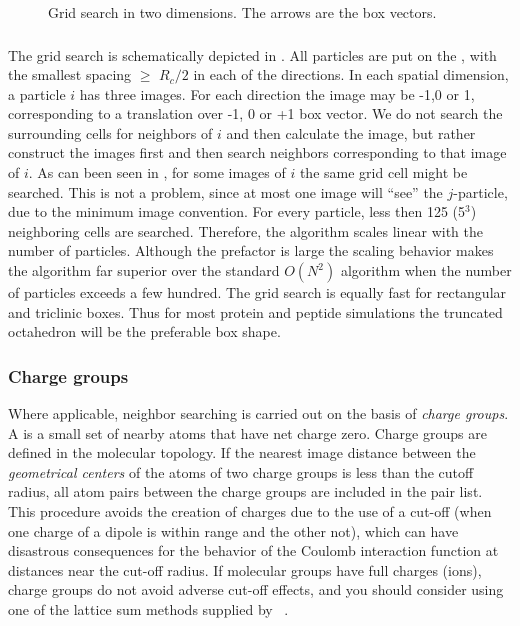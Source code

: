 \begin{figure}
\centerline{}
\caption {Grid search in two dimensions. The arrows are the box vectors.}
\label{fig:grid}
\end{figure}

\subsubsection{}
\label{sec:nsgrid}
The grid search is schematically depicted in .
All particles are put on the {\nsgrid}, with the smallest spacing
$\ge$ $R_c/2$ in each of the directions.
In each spatial dimension, a particle $i$ has three images. For each
direction the image may be -1,0 or 1, corresponding to a translation
over -1, 0 or +1 box vector. We do not search the surrounding
{\nsgrid} cells for neighbors of $i$ and then calculate the image, but
rather construct the images first and then search neighbors
corresponding to that image of $i$.
As can been seen in , for some images of $i$ the same
grid cell might be searched. This is not a problem, since at most one
image will ``see'' the $j$-particle, due to the minimum image convention.
For every particle, less then 125 (5$^3$) neighboring cells are searched.
Therefore, the algorithm scales linear with the number of particles.
Although the prefactor is large
the scaling behavior makes the algorithm far superior over the
standard $O(N^2)$ algorithm when the number of particles
exceeds a few hundred.
The grid search is equally fast for rectangular and triclinic boxes.
Thus for most protein and peptide simulations the truncated
octahedron will be the preferable box shape.

\subsubsection{Charge groups}
Where applicable, neighbor searching is carried out on the basis of
{\em charge groups}. A  is a small set of nearby atoms
that  have net charge zero. Charge groups are defined in the molecular
topology. If the nearest image  distance between the {\em geometrical
centers} of the atoms of two charge groups is less than the cutoff
radius,  all atom pairs between the charge groups are included in the
pair list. This procedure avoids the creation of charges due to
the use  of a cut-off (when one charge of a dipole is within range and
the  other not), which can have disastrous consequences for the
behavior of  the Coulomb interaction function at distances near the
cut-off  radius. If molecular groups have full charges (ions), charge
groups  do not avoid adverse cut-off effects, and you should consider
using one of the lattice sum methods supplied by {\gromacs}~\cite{Berendsen93a}. 

